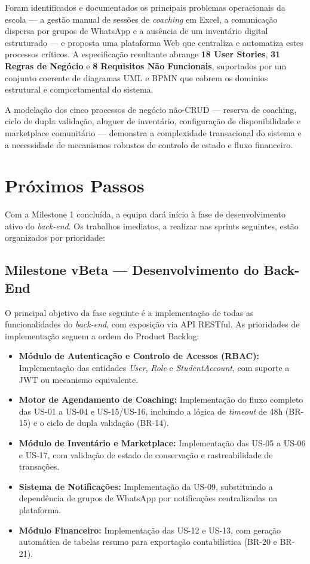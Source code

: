 \documentclass[12pt,a4paper]{report}
\begin{document}
Foram identificados e documentados os principais problemas operacionais da escola --- a gestão manual de sessões de \textit{coaching} em Excel, a comunicação dispersa por grupos de WhatsApp e a ausência de um inventário digital estruturado --- e proposta uma plataforma Web que centraliza e automatiza estes processos críticos. A especificação resultante abrange \textbf{18 User Stories}, \textbf{31 Regras de Negócio} e \textbf{8 Requisitos Não Funcionais}, suportados por um conjunto coerente de diagramas UML e BPMN que cobrem os domínios estrutural e comportamental do sistema.

A modelação dos cinco processos de negócio não-CRUD --- reserva de coaching, ciclo de dupla validação, aluguer de inventário, configuração de disponibilidade e marketplace comunitário --- demonstra a complexidade transacional do sistema e a necessidade de mecanismos robustos de controlo de estado e fluxo financeiro.

\section{Próximos Passos}

Com a Milestone 1 concluída, a equipa dará início à fase de desenvolvimento ativo do \textit{back-end}. Os trabalhos imediatos, a realizar nas sprints seguintes, estão organizados por prioridade:

\subsection{Milestone vBeta — Desenvolvimento do Back-End}
O principal objetivo da fase seguinte é a implementação de todas as funcionalidades do \textit{back-end}, com exposição via API RESTful. As prioridades de implementação seguem a ordem do Product Backlog:
\begin{itemize}
    \item \textbf{Módulo de Autenticação e Controlo de Acessos (RBAC):} Implementação das entidades \textit{User}, \textit{Role} e \textit{StudentAccount}, com suporte a JWT ou mecanismo equivalente.
    \item \textbf{Motor de Agendamento de Coaching:} Implementação do fluxo completo das US-01 a US-04 e US-15/US-16, incluindo a lógica de \textit{timeout} de 48h (BR-15) e o ciclo de dupla validação (BR-14).
    \item \textbf{Módulo de Inventário e Marketplace:} Implementação das US-05 a US-06 e US-17, com validação de estado de conservação e rastreabilidade de transações.
    \item \textbf{Sistema de Notificações:} Implementação da US-09, substituindo a dependência de grupos de WhatsApp por notificações centralizadas na plataforma.
    \item \textbf{Módulo Financeiro:} Implementação das US-12 e US-13, com geração automática de tabelas resumo para exportação contabilística (BR-20 e BR-21).
\end{itemize}
\end{document}
